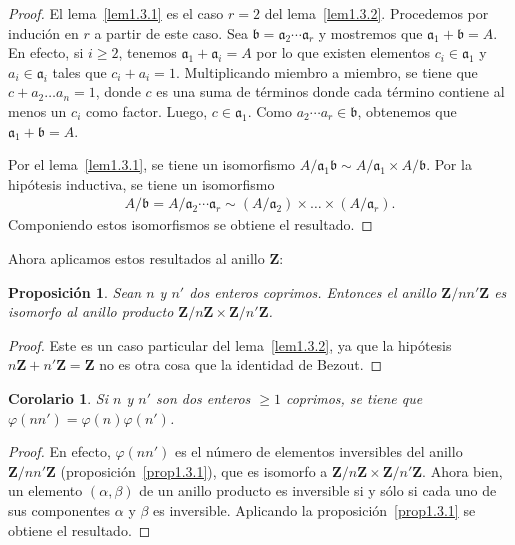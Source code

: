 \documentclass[oneside,bibtotoc,leqno,spanish]{amsbook}
\newcommand{\ZZ}{\mathbf{Z}}
\newcommand{\idl}[1]{\mathfrak{#1}}
\newcommand{\QED}{}%
\numberwithin{equation}{section}
\theoremstyle{defi}
\theoremstyle{note}
\newtheorem{proposition}{Proposici\'on}
\newtheorem{corollary}{Corolario}
\theoremstyle{rem}
\numberwithin{theorem}{section}
\numberwithin{proposition}{section}
\numberwithin{definition}{section}
\numberwithin{lemma}{section}
\numberwithin{corollary}{section}
\numberwithin{example}{section}
\numberwithin{footnote}{section}%
\begin{document}
\begin{proof}
El lema~\ref{lem1.3.1} es el caso $r=2$ del lema~\ref{lem1.3.2}. Procedemos por induci\'on en $r$ a partir de este
caso. Sea $\idl{b} = \idl{a}_{2}\cdots\idl{a}_{r}$ y mostremos que $\idl{a}_{1}+\idl{b}=A$.
En efecto, si $i\geq 2$, tenemos $\idl{a}_{1}+\idl{a}_{i} = A$ por lo que existen
elementos $c_{i}\in\idl{a}_{1}$ y $a_{i}\in\idl{a}_{i}$ tales que $c_{i}+a_{i} = 1$. Multiplicando
miembro a miembro, se tiene que $c+a_{2}\dots a_{n} = 1$, donde $c$ es una suma de t\'erminos
donde cada t\'ermino contiene al menos un $c_{i}$ como factor. Luego, $c\in\idl{a}_{1}$. Como
$a_{2}\cdots a_{r}\in\idl{b}$, obtenemos que $\idl{a}_{1}+\idl{b} =A$.

Por el lema~\ref{lem1.3.1}, se tiene un isomorfismo
$A/\idl{a}_{1}\idl{b}\sim A/\idl{a}_{1}\times A/\idl{b}$.
Por la hip\'otesis inductiva, se tiene un isomorfismo
\begin{gather*}
A/\idl{b} = A/\idl{a}_{2}\cdots\idl{a}_{r}\sim (A/\idl{a}_{2})\times\dots\times(A/\idl{a}_{r}).
\end{gather*}
Componiendo estos isomorfismos se obtiene el resultado. \QED
\end{proof}

Ahora aplicamos estos resultados al anillo $\ZZ$:

\begin{proposition}
Sean $n$ y $n'$ dos enteros coprimos. Entonces el anillo $\ZZ/nn'\ZZ$ es isomorfo al anillo
producto $\ZZ/n\ZZ\times\ZZ/n'\ZZ$.
\end{proposition}

\begin{proof}
Este es un caso particular del lema~\ref{lem1.3.2}, ya que la hip\'otesis $n\ZZ+n'\ZZ=\ZZ$
no es otra cosa que la identidad de Bezout.
\end{proof}

\begin{corollary}\label{coro1.3.1}
Si $n$ y $n'$ son dos enteros $\geq 1$ coprimos, se tiene que
$\varphi(nn') = \varphi(n)\varphi(n')$.
\end{corollary}

\begin{proof}
En efecto, $\varphi(nn')$ es el n\'umero de elementos inversibles del anillo $\ZZ/nn'\ZZ$
(proposici\'on~\ref{prop1.3.1}), que es isomorfo a $\ZZ/n\ZZ\times\ZZ/n'\ZZ$. Ahora
bien, un elemento
$(\alpha,\beta)$ de un anillo producto es inversible si y s\'olo si cada uno de sus componentes
$\alpha$ y $\beta$ es inversible. Aplicando la proposici\'on~\ref{prop1.3.1} se
obtiene el resultado.
\end{proof}
\end{document}

